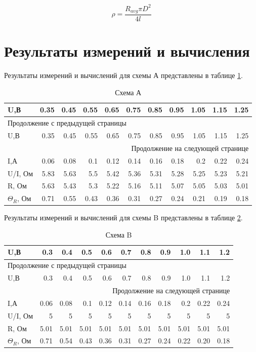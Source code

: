 \documentclass[14pt]{extarticle}
\begin{document}
\begin{equation}
\label{eq:orgb892e88}
\rho = \frac{R_{avg} \pi D^2}{4l}
\end{equation}
\section{Результаты измерений и вычисления}
\label{sec:org48eda64}

Результаты измерений и вычислений для схемы А представлены в таблице \ref{tab:orgf1ed3c3}.

\begin{longtable}{|l|r|r|r|r|r|r|r|r|r|r|}
\caption{\label{tab:orgf1ed3c3}Схема А}
\\
\hline
U,В & 0.35 & 0.45 & 0.55 & 0.65 & 0.75 & 0.85 & 0.95 & 1.05 & 1.15 & 1.25\\
\hline
\endfirsthead
\multicolumn{11}{l}{Продолжение с предыдущей страницы} \\
\hline

U,В & 0.35 & 0.45 & 0.55 & 0.65 & 0.75 & 0.85 & 0.95 & 1.05 & 1.15 & 1.25 \\

\hline
\endhead
\hline\multicolumn{11}{r}{Продолжение на следующей странице} \\
\endfoot
\endlastfoot
\hline
I,А & 0.06 & 0.08 & 0.1 & 0.12 & 0.14 & 0.16 & 0.18 & 0.2 & 0.22 & 0.24\\
\hline
U/I, Ом & 5.83 & 5.63 & 5.5 & 5.42 & 5.36 & 5.31 & 5.28 & 5.25 & 5.23 & 5.21\\
\hline
R, Ом & 5.63 & 5.43 & 5.3 & 5.22 & 5.16 & 5.11 & 5.07 & 5.05 & 5.03 & 5.01\\
\hline
\(\Theta_R\), Ом & 0.71 & 0.55 & 0.43 & 0.36 & 0.31 & 0.27 & 0.24 & 0.21 & 0.19 & 0.18\\
\hline
\end{longtable}

Результаты измерений и вычислений для схемы B представлены в таблице \ref{tab:orgb2667b1}.


\begin{longtable}{|l|r|r|r|r|r|r|r|r|r|r|}
\caption{\label{tab:orgb2667b1}Схема B}
\\
\hline
U,В & 0.3 & 0.4 & 0.5 & 0.6 & 0.7 & 0.8 & 0.9 & 1.0 & 1.1 & 1.2\\
\hline
\endfirsthead
\multicolumn{11}{l}{Продолжение с предыдущей страницы} \\
\hline

U,В & 0.3 & 0.4 & 0.5 & 0.6 & 0.7 & 0.8 & 0.9 & 1.0 & 1.1 & 1.2 \\

\hline
\endhead
\hline\multicolumn{11}{r}{Продолжение на следующей странице} \\
\endfoot
\endlastfoot
\hline
I,А & 0.06 & 0.08 & 0.1 & 0.12 & 0.14 & 0.16 & 0.18 & 0.2 & 0.22 & 0.24\\
\hline
U/I, Ом & 5 & 5 & 5 & 5 & 5 & 5 & 5 & 5 & 5 & 5\\
\hline
R, Ом & 5.01 & 5.01 & 5.01 & 5.01 & 5.01 & 5.01 & 5.01 & 5.01 & 5.01 & 5.01\\
\hline
\(\Theta_R\), Ом & 0.71 & 0.54 & 0.43 & 0.36 & 0.31 & 0.27 & 0.24 & 0.22 & 0.20 & 0.18\\
\hline
\end{longtable}
\end{document}
